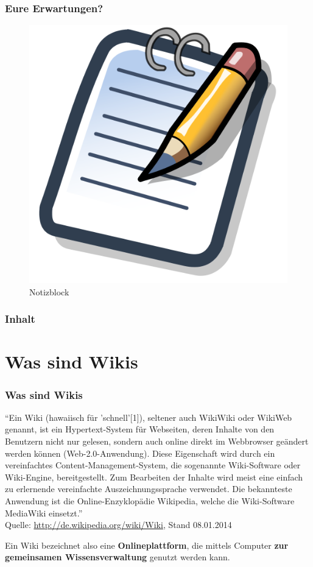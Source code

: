 \documentclass{beamer}              %
\begin{document}
\begin{frame}
  \frametitle{Eure Erwartungen?}

	\begin{figure}[tbph]
		\centering
		\includegraphics[width=0.7\linewidth]{500px-Notepad_icon}
		\caption[Notizblock]{Notizblock}
		\label{fig:500px-Notepad_icon}
	\end{figure}
  
\end{frame}


\begin{frame}
  \frametitle{Inhalt}
  \tableofcontents
\end{frame}

\AtBeginSection{%
  \tableofcontents[currentsection]
}

\section{Was sind Wikis}

\begin{frame}
  \frametitle{Was sind Wikis}
  \begin{block}{}
    {\small \textquotedblleft Ein Wiki (hawaiisch für 'schnell'[1]), seltener auch WikiWiki
    oder WikiWeb genannt, ist ein Hypertext-System für Webseiten, deren
    Inhalte von den Benutzern nicht nur gelesen, sondern auch online direkt
    im Webbrowser geändert werden können (Web-2.0-Anwendung). Diese
    Eigenschaft wird durch ein vereinfachtes Content-Management-System, die
    sogenannte Wiki-Software oder Wiki-Engine, bereitgestellt. Zum
    Bearbeiten der Inhalte wird meist eine einfach zu erlernende
    vereinfachte Auszeichnungssprache verwendet. Die bekannteste Anwendung
    ist die Online-Enzyklopädie Wikipedia, welche die Wiki-Software
    MediaWiki einsetzt.\textquotedblright  \\ Quelle: \url{http://de.wikipedia.org/wiki/Wiki}, Stand 08.01.2014}
  \end{block}
  \begin{block}{}
    Ein Wiki bezeichnet also eine \textbf{Onlineplattform}, die mittels
    Computer \textbf{zur gemeinsamen Wissensverwaltung} genutzt werden
    kann.
  \end{block}
\end{frame}
\end{document}
